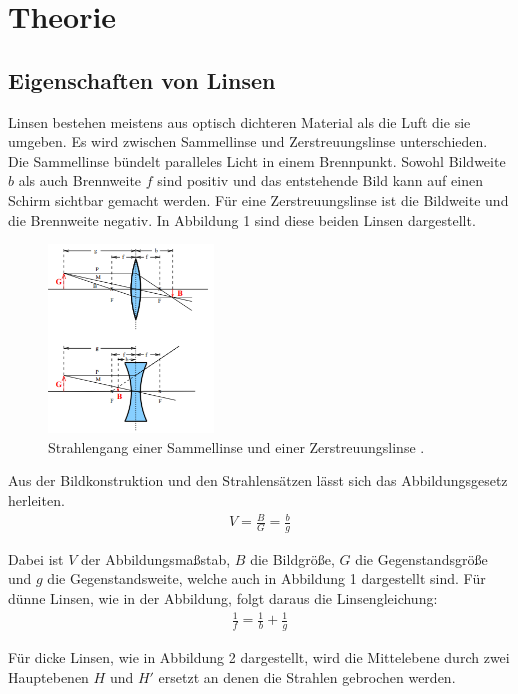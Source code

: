 \section{Theorie}
\label{sec:Theorie}

\subsection{Eigenschaften von Linsen}
Linsen bestehen meistens aus optisch dichteren Material als die Luft die sie
umgeben. Es wird zwischen Sammellinse und Zerstreuungslinse unterschieden. Die
Sammellinse bündelt paralleles Licht in einem Brennpunkt. Sowohl Bildweite $b$ als auch
Brennweite $f$ sind positiv und das entstehende Bild kann auf einen Schirm sichtbar gemacht werden.
Für eine Zerstreuungslinse ist die Bildweite und die Brennweite negativ. In Abbildung 1 sind diese
beiden Linsen dargestellt.

\begin{figure}[H]
  \centering
  \includegraphics[height=5cm]{linsen.PNG}
  \caption{Strahlengang einer Sammellinse und einer Zerstreuungslinse \cite{sample}.}
  \label{fig:biegungbild1}
\end{figure}

Aus der Bildkonstruktion und den Strahlensätzen lässt sich das Abbildungsgesetz herleiten.
\begin{align}
  V =\frac{B}{G} = \frac{b}{g}
\end{align}

Dabei ist $V$ der Abbildungsmaßstab, $B$ die Bildgröße, $G$ die Gegenstandsgröße und $g$ die Gegenstandsweite, welche
auch in Abbildung 1 dargestellt sind.
Für dünne Linsen, wie in der Abbildung, folgt daraus die Linsengleichung:
\begin{align}
  \frac{1}{f} = \frac{1}{b} + \frac{1}{g}
\end{align}

Für dicke Linsen, wie in Abbildung 2 dargestellt, wird die Mittelebene durch zwei Hauptebenen $H$ und $H'$ ersetzt
an denen die Strahlen gebrochen werden.


